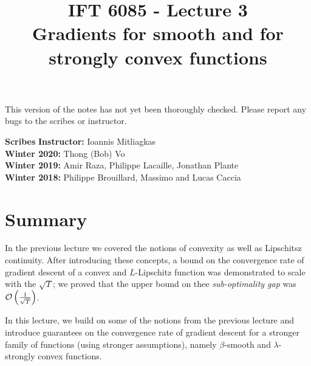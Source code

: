 \documentclass{article}
\title{IFT 6085 - Lecture 3 \\ 
Gradients for smooth and for strongly convex functions}
\date{}
\begin{document}
 

\maketitle

\vspace{-0.5in}
\begin{center}
This version of the notes has not yet been thoroughly checked.
Please report any bugs to the scribes or instructor.
\end{center}
\vspace{0.2in}

\textbf{Scribes}\hfill
\textbf{Instructor:}  Ioannis Mitliagkas\\
\textbf{Winter 2020:} Thong (Bob) Vo\\
\textbf{Winter 2019:} Amir Raza, Philippe Lacaille, Jonathan Plante\\
\textbf{Winter 2018:} Philippe Brouillard, Massimo and Lucas Caccia



\newcommand{\infgc}{\inf_{g \in \mathcal{C}}}
\newcommand{\supgc}{\sup_{g \in \mathcal{C}}}

\newcommand{\Prob}{\mathbb{P}}
\newcommand{\reals}{\mathbb{R}}

\section{Summary}

In the previous lecture we covered the notions of convexity as well as Lipschitsz continuity. 
After introducing these concepts, a bound on the convergence rate of gradient descent of a convex and $L$-Lipschitz function was demonstrated to scale with the $\sqrt{T}$; we proved that the upper bound on thee \emph{sub-optimality gap} was $\mathcal{O}\left(\frac{1}{\sqrt{T}}\right)$.

In this lecture, we build on some of the notions from the previous lecture and introduce guarantees on the convergence rate of gradient descent for a stronger family of functions (using stronger assumptions), namely $\beta$-smooth and $\lambda$-strongly convex functions.
\end{document}
